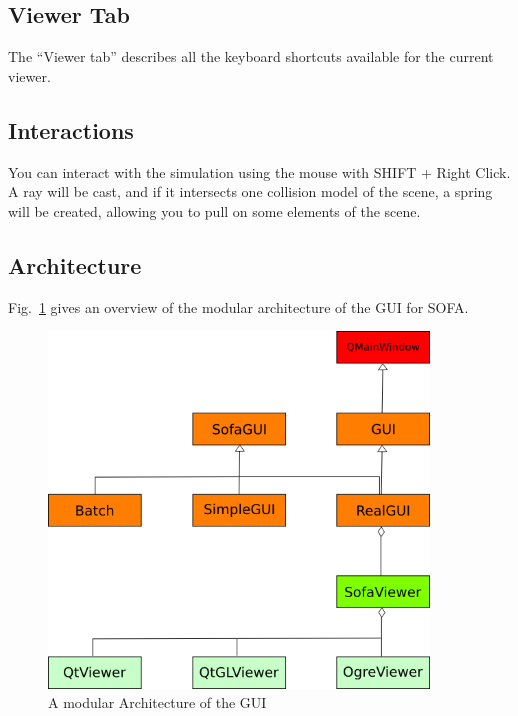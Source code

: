 \subsection{Viewer Tab}
The ``Viewer tab'' describes all the keyboard shortcuts available for the current viewer.








\subsection{Interactions}
You can interact with the simulation using the mouse with SHIFT + Right Click. A ray will be cast, and if it intersects one collision model of the scene, a spring will be created, allowing you to pull on some elements of the scene.



\newpage
\subsection{Architecture}
Fig.~\ref{fig:GUI_UML} gives an overview of the modular architecture of the GUI for SOFA. 
\begin{figure}[htpb]
	\centering
		\includegraphics[width=0.9\textwidth]{GUI/GUI_UML.png}
	\caption{A modular Architecture of the GUI}
 	\label{fig:GUI_UML}
\end{figure}








